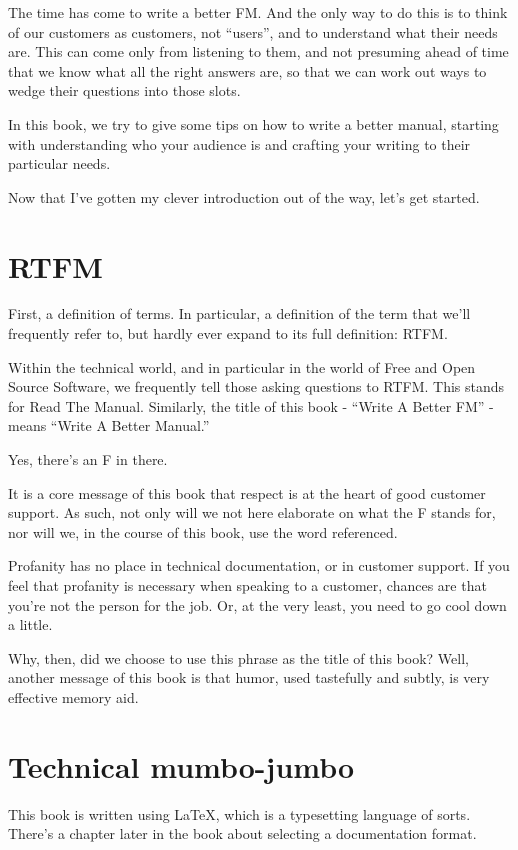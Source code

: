 The time has come to write a better FM. And the only way to do this is
to think of our customers as customers, not ``users'', and to understand
what their needs are. This can come only from listening to them, and not
presuming ahead of time that we know what all the right answers are, so
that we can work out ways to wedge their questions into those slots.

In this book, we try to give some tips on how to write a better manual,
starting with understanding who your audience is and crafting your
writing to their particular needs.

Now that I've gotten my clever introduction out of the way, let's get
started.

\section{RTFM}

First, a definition of terms. In particular, a definition of the term
that we'll frequently refer to, but hardly ever expand to its full
definition: RTFM.

Within the technical world, and in particular in the world of Free and
Open Source Software, we frequently tell those asking questions to RTFM.
This stands for Read The Manual. Similarly, the title of this book -
``Write A Better FM'' - means ``Write A Better Manual.''

Yes, there's an F in there.

It is a core message of this book that respect is at the heart of good
customer support. As such, not only will we not here elaborate on what
the F stands for, nor will we, in the course of this book, use the word
referenced.

Profanity has no place in technical documentation, or in customer
support. If you feel that profanity is necessary when speaking to a
customer, chances are that you're not the person for the job. Or, at the
very least, you need to go cool down a little.

Why, then, did we choose to use this phrase as the title of this book?
Well, another message of this book is that humor, used tastefully and
subtly, is very effective memory aid.

\section{Technical mumbo-jumbo}

This book is written using LaTeX, which is a typesetting language of
sorts. There's a chapter later in the book about selecting a
documentation format.

